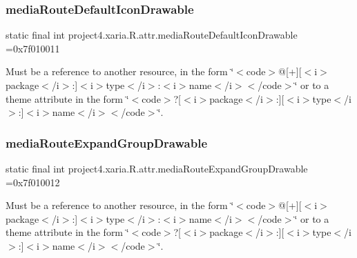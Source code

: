 \subsubsection{\texorpdfstring{media\+Route\+Default\+Icon\+Drawable}{mediaRouteDefaultIconDrawable}}
{\footnotesize\ttfamily static final int project4.\+xaria.\+R.\+attr.\+media\+Route\+Default\+Icon\+Drawable =0x7f010011\hspace{0.3cm}{\ttfamily [static]}}

Must be a reference to another resource, in the form \char`\"{}$<$code$>$@\mbox{[}+\mbox{]}\mbox{[}$<$i$>$package$<$/i$>$\+:\mbox{]}$<$i$>$type$<$/i$>$\+:$<$i$>$name$<$/i$>$$<$/code$>$\char`\"{} or to a theme attribute in the form \char`\"{}$<$code$>$?\mbox{[}$<$i$>$package$<$/i$>$\+:\mbox{]}\mbox{[}$<$i$>$type$<$/i$>$\+:\mbox{]}$<$i$>$name$<$/i$>$$<$/code$>$\char`\"{}. \mbox{\label{classproject4_1_1xaria_1_1R_1_1attr_ad00dd114a011b451410b5601485eb4c5}} 
\subsubsection{\texorpdfstring{media\+Route\+Expand\+Group\+Drawable}{mediaRouteExpandGroupDrawable}}
{\footnotesize\ttfamily static final int project4.\+xaria.\+R.\+attr.\+media\+Route\+Expand\+Group\+Drawable =0x7f010012\hspace{0.3cm}{\ttfamily [static]}}

Must be a reference to another resource, in the form \char`\"{}$<$code$>$@\mbox{[}+\mbox{]}\mbox{[}$<$i$>$package$<$/i$>$\+:\mbox{]}$<$i$>$type$<$/i$>$\+:$<$i$>$name$<$/i$>$$<$/code$>$\char`\"{} or to a theme attribute in the form \char`\"{}$<$code$>$?\mbox{[}$<$i$>$package$<$/i$>$\+:\mbox{]}\mbox{[}$<$i$>$type$<$/i$>$\+:\mbox{]}$<$i$>$name$<$/i$>$$<$/code$>$\char`\"{}. \mbox{\label{classproject4_1_1xaria_1_1R_1_1attr_a143f2e85eb078f3c310985128ac6907d}} 
